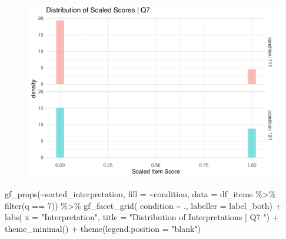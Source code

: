 \documentclass[
  letterpaper,
  DIV=11,
  numbers=noendperiod]{scrreprt}
\newenvironment{Shaded}{\begin{snugshade}}{\end{snugshade}}
\newcommand{\AttributeTok}[1]{\textcolor[rgb]{0.40,0.45,0.13}{#1}}
\newcommand{\DecValTok}[1]{\textcolor[rgb]{0.68,0.00,0.00}{#1}}
\newcommand{\FunctionTok}[1]{\textcolor[rgb]{0.28,0.35,0.67}{#1}}
\newcommand{\NormalTok}[1]{\textcolor[rgb]{0.00,0.23,0.31}{#1}}
\newcommand{\SpecialCharTok}[1]{\textcolor[rgb]{0.37,0.37,0.37}{#1}}
\newcommand{\StringTok}[1]{\textcolor[rgb]{0.13,0.47,0.30}{#1}}
\begin{document}
\begin{figure}[H]

{\centering \includegraphics{analysis/SGC3A/2_sgc3A_scoring_files/figure-pdf/Q7-distribution-1.pdf}

}

\end{figure}

\begin{Shaded}
\begin{Highlighting}[]
\FunctionTok{gf\_props}\NormalTok{(}\SpecialCharTok{\textasciitilde{}}\NormalTok{sorted\_interpretation, }\AttributeTok{fill =} \SpecialCharTok{\textasciitilde{}}\NormalTok{condition, }\AttributeTok{data =}\NormalTok{ df\_items }\SpecialCharTok{\%\textgreater{}\%} \FunctionTok{filter}\NormalTok{(q }\SpecialCharTok{==} \DecValTok{7}\NormalTok{)) }\SpecialCharTok{\%\textgreater{}\%} 
  \FunctionTok{gf\_facet\_grid}\NormalTok{( condition }\SpecialCharTok{\textasciitilde{}}\NormalTok{ ., }\AttributeTok{labeller =}\NormalTok{ label\_both) }\SpecialCharTok{+} 
  \FunctionTok{labs}\NormalTok{( }\AttributeTok{x =} \StringTok{"Interpretation"}\NormalTok{, }\AttributeTok{title =} \StringTok{"Distribution of Interpretations | Q7 "}\NormalTok{) }\SpecialCharTok{+} 
  \FunctionTok{theme\_minimal}\NormalTok{() }\SpecialCharTok{+} \FunctionTok{theme}\NormalTok{(}\AttributeTok{legend.position =} \StringTok{"blank"}\NormalTok{)}
\end{Highlighting}
\end{Shaded}
\end{document}
